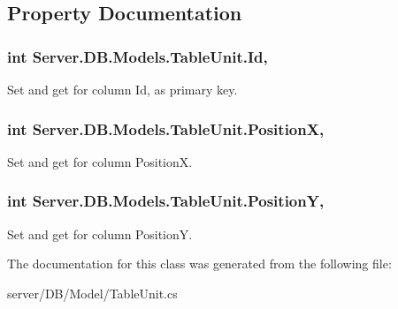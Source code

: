\subsection{Property Documentation}
\hypertarget{classServer_1_1DB_1_1Models_1_1TableUnit_a6b41f5c204d9a336e057de1ea5bc7602}{
\subsubsection[{Id}]{\setlength{\rightskip}{0pt plus 5cm}int Server.\-D\-B.\-Models.\-Table\-Unit.\-Id\hspace{0.3cm}{\ttfamily [get]}, {\ttfamily [set]}}}\label{classServer_1_1DB_1_1Models_1_1TableUnit_a6b41f5c204d9a336e057de1ea5bc7602}


Set and get for column Id, as primary key. 

\hypertarget{classServer_1_1DB_1_1Models_1_1TableUnit_ac3f6fbba28d575332fb8272acea1ede7}{
\subsubsection[{Position\-X}]{\setlength{\rightskip}{0pt plus 5cm}int Server.\-D\-B.\-Models.\-Table\-Unit.\-Position\-X\hspace{0.3cm}{\ttfamily [get]}, {\ttfamily [set]}}}\label{classServer_1_1DB_1_1Models_1_1TableUnit_ac3f6fbba28d575332fb8272acea1ede7}


Set and get for column Position\-X. 

\hypertarget{classServer_1_1DB_1_1Models_1_1TableUnit_a9f536f4d39ce82ef7071734b2037fde8}{
\subsubsection[{Position\-Y}]{\setlength{\rightskip}{0pt plus 5cm}int Server.\-D\-B.\-Models.\-Table\-Unit.\-Position\-Y\hspace{0.3cm}{\ttfamily [get]}, {\ttfamily [set]}}}\label{classServer_1_1DB_1_1Models_1_1TableUnit_a9f536f4d39ce82ef7071734b2037fde8}


Set and get for column Position\-Y. 



The documentation for this class was generated from the following file\-:\begin{DoxyCompactItemize}
\item 
server/\-D\-B/\-Model/Table\-Unit.\-cs\end{DoxyCompactItemize}
